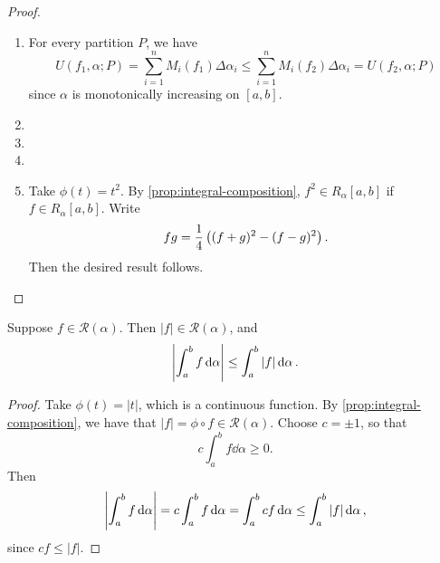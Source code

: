 \begin{proof}
\begin{enumerate}[label=(\roman*)]
\item For every partition $P$, we have
\[U(f_1,\alpha;P)=\sum_{i=1}^{n}M_i(f_1)\Delta\alpha_i\le\sum_{i=1}^{n}M_i(f_2)\Delta\alpha_i=U(f_2,\alpha;P)\]
since $\alpha$ is monotonically increasing on $[a,b]$.

\item 
\item 
\item 
\item Take $\phi(t)=t^2$. By \ref{prop:integral-composition}, $f^2\in R_\alpha[a,b]$ if $f\in R_\alpha[a,b]$. Write
\[fg=\frac{1}{4}\left((f+g)^2-(f-g)^2\right).\]
Then the desired result follows.
\end{enumerate}
\end{proof}

\begin{lemma}
Suppose $f\in\mathcal{R}(\alpha)$. Then $|f|\in \mathcal{R}(\alpha)$, and
\[\left|\int_a^bf\dd{\alpha}\right|\le\int_a^b|f|\dd{\alpha}.\]
\end{lemma}

\begin{proof}
Take $\phi(t)=|t|$, which is a continuous function. By \ref{prop:integral-composition}, we have that $|f|=\phi\circ f\in\mathcal{R}(\alpha)$. Choose $c=\pm1$, so that
\[c\int_{a}^{b}f\dd{\alpha}\ge0.\]
Then
\[\left|\int_{a}^{b}f\dd{\alpha}\right|=c\int_{a}^{b}f\dd{\alpha}=\int_{a}^{b}cf\dd{\alpha}\le\int_{a}^{b}|f|\dd{\alpha},\]
since $cf\le|f|$.
\end{proof}

